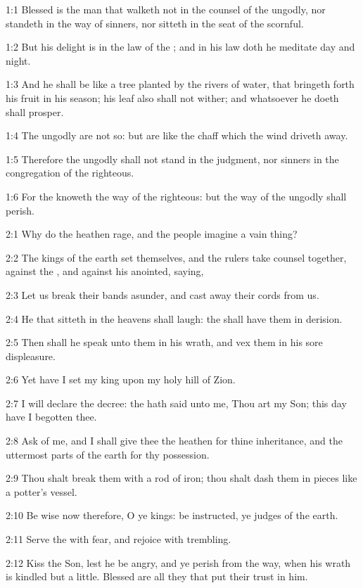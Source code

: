 

1:1 Blessed is the man that walketh not in the counsel of the ungodly, nor standeth in the way of sinners, nor sitteth in the seat of the scornful.

1:2 But his delight is in the law of the \LORD; and in his law doth he meditate day and night.

1:3 And he shall be like a tree planted by the rivers of water, that bringeth forth his fruit in his season; his leaf also shall not wither; and whatsoever he doeth shall prosper.

1:4 The ungodly are not so: but are like the chaff which the wind driveth away.

1:5 Therefore the ungodly shall not stand in the judgment, nor sinners in the congregation of the righteous.

1:6 For the \LORD knoweth the way of the righteous: but the way of the ungodly shall perish.



2:1 Why do the heathen rage, and the people imagine a vain thing?

2:2 The kings of the earth set themselves, and the rulers take counsel together, against the \LORD, and against his anointed, saying,

2:3 Let us break their bands asunder, and cast away their cords from us.

2:4 He that sitteth in the heavens shall laugh: the \LORD shall have them in derision.

2:5 Then shall he speak unto them in his wrath, and vex them in his sore displeasure.

2:6 Yet have I set my king upon my holy hill of Zion.

2:7 I will declare the decree: the \LORD hath said unto me, Thou art my Son; this day have I begotten thee.

2:8 Ask of me, and I shall give thee the heathen for thine inheritance, and the uttermost parts of the earth for thy possession.

2:9 Thou shalt break them with a rod of iron; thou shalt dash them in pieces like a potter's vessel.

2:10 Be wise now therefore, O ye kings: be instructed, ye judges of the earth.

2:11 Serve the \LORD with fear, and rejoice with trembling.

2:12 Kiss the Son, lest he be angry, and ye perish from the way, when his wrath is kindled but a little. Blessed are all they that put their trust in him.



